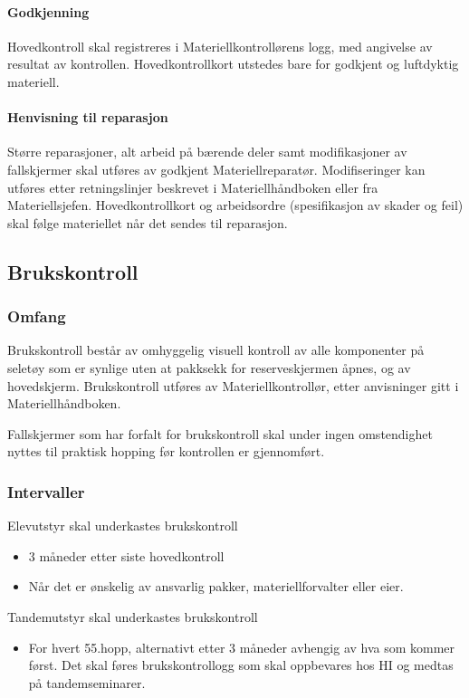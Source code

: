 \paragraph{Godkjenning}
Hovedkontroll skal registreres i Materiellkontrollørens logg, med angivelse av resultat av kontrollen. Hovedkontrollkort utstedes bare for godkjent og luftdyktig materiell.

\paragraph{Henvisning til reparasjon}
Større reparasjoner, alt arbeid på bærende deler samt modifikasjoner av fallskjermer skal utføres av godkjent Materiellreparatør. Modifiseringer kan utføres etter retningslinjer beskrevet i Materiellhåndboken eller fra Materiellsjefen. Hovedkontrollkort og arbeidsordre (spesifikasjon av skader og feil) skal følge materiellet når det sendes til reparasjon.

\subsection{Brukskontroll}
\subsubsection{Omfang}
Brukskontroll består av omhyggelig visuell kontroll av alle komponenter på seletøy som er synlige uten at pakksekk for reserveskjermen åpnes, og av hovedskjerm. Brukskontroll utføres av Materiellkontrollør, etter anvisninger gitt i Materiellhåndboken.

Fallskjermer som har forfalt for brukskontroll skal under ingen omstendighet nyttes til praktisk hopping før kontrollen er gjennomført.

\subsubsection{Intervaller}
Elevutstyr skal underkastes brukskontroll
\begin{itemize}
	\item 3 måneder etter siste hovedkontroll
	\item Når det er ønskelig av ansvarlig pakker, materiellforvalter eller eier.
\end{itemize}

Tandemutstyr skal underkastes brukskontroll
\begin{itemize}
	\item For hvert 55.hopp, alternativt etter 3 måneder avhengig av hva som kommer først. Det skal føres brukskontrollogg som skal oppbevares hos HI og medtas på tandemseminarer.
\end{itemize}

